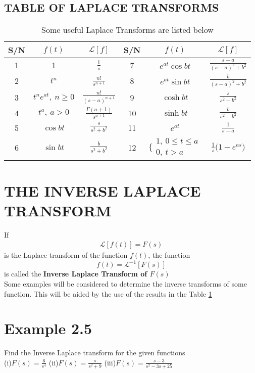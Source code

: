 \documentclass[11pt]{report}
\newcommand{\Laplace}{\mathcal{L}}
\newcommand{\ft}{f(t)}
\newcommand{\Fs}{F(s)}
\newcommand{\sbracket}[1]{\left[#1\right]}
\newcommand{\LFt}{\Laplace \sbracket{\ft}}
\newcommand{\LFn}[1]{\Laplace \sbracket{#1}}
\newcommand{\InverseL}[1]{\Laplace^{-1}\left[#1\right]}
\newcommand{\bt}[1]{\textbf{#1}}
\newcommand{\dsp}{\displaystyle}
\begin{document}
	\subsection{TABLE OF LAPLACE TRANSFORMS}
	\renewcommand{\arraystretch}{1.4}
	\begin{longtable}{|c|c|c|c|c|c|}
		\caption{Some useful Laplace Transforms are listed below} \label{tab:2_1}\\[-0.5cm]
		\hline
			S/N & $f(t)$ & $\LFn{f}$ & S/N & $f(t)$ & $\LFn{f}$\\ \hline
			1 &  1 & $\frac{1}{s}$ & 7 & $e^{at}\cos bt$ & $\dsp\frac{s-a}{(s-a)^2 + b^2}$\\\hline
			2 & $t^n$ & $\dsp\frac{n!}{s^{n+1}}$ & 8 & $\dsp e^{at}\sin bt$ & $\dsp\frac{b}{(s-a)^2 + b^2}$\\\hline
			3 & $\dsp t^n e^{at},~ n\geq 0$& $\dsp \frac{n!}{(s-a)^{n+1}}$ & 9 & $\cosh bt$ & $\dsp\frac{s}{s^2-b^2}$\\\hline
			4 & $\dsp t^a, ~ a > 0 $ & $\dsp \frac{\Gamma(a+1)}{s^{a+1}}$ & 10 & $\sinh bt$ & $\dsp \frac{b}{s^2 - b^2}$\\\hline
			5 & $\cos bt$ & $\dsp \frac{s}{s^2 + b^2}$ & 11 & $e^{at}$ & $\dsp\frac{1}{s-a}$\\\hline
			6 & $\sin bt$ & $\dsp\frac{b}{s^2+b^2}$ & 12 & $\dsp \Bigg\{ \begin{array}{l}
				1,~ 0 \leq t \leq a\\
				0,~ t > a
			\end{array}$ & $\dsp \frac{1}{s}\Big(1-e^{as}\Big)$\\\hline
	\end{longtable}
	
	
	\section{THE INVERSE LAPLACE TRANSFORM}
	If
	\begin{eqnarray*}
		\LFt = F(s)
	\end{eqnarray*}
	is the Laplace transform of the function $\ft$, the function
	\begin{equation*}
		\ft = \InverseL{F(s)}
	\end{equation*}
	is called the \bt{Inverse Laplace Transform of $\Fs$}\\
	Some examples will be considered to determine the inverse transforms of some function. This will be aided by the use of the results in the Table \ref{tab:2_1}
	
	\section*{Example 2.5}
	Find the Inverse Laplace transform for the given functions\\
	(i)$\dsp F(s) =\frac{6}{s^4}$ \qquad (ii)$\dsp F(s)=\frac{s}{s^2 + 9}$ \qquad (iii)$\dsp F(s)=\frac{s-3}{s^2-3s + 25}$
	
\end{document}
